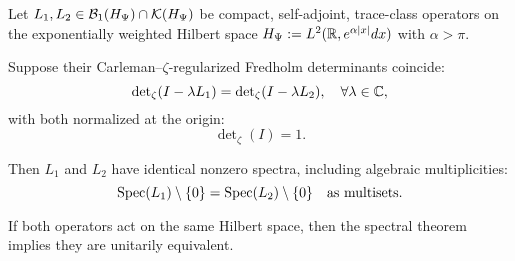 \begin{lemma}
\label{lem:spectral_rigidity_determinant}

Let \( L_1, L_2 \in \mathcal{B}_1(H_{\Psi}) \cap \mathcal{K}(H_{\Psi}) \) be compact, self-adjoint, trace-class operators on the exponentially weighted Hilbert space \( H_{\Psi} := L^2(\mathbb{R}, e^{\alpha|x|}dx) \) with \( \alpha > \pi \).

Suppose their Carleman–\(\zeta\)-regularized Fredholm determinants coincide:
\[
\det\nolimits_\zeta(I - \lambda L_1) = \det\nolimits_\zeta(I - \lambda L_2),
\quad \forall \lambda \in \mathbb{C},
\]
with both normalized at the origin:
\[
\det\nolimits_\zeta(I) = 1.
\]

Then \( L_1 \) and \( L_2 \) have identical nonzero spectra, including algebraic multiplicities:
\[
\operatorname{Spec}(L_1) \setminus \{0\} = \operatorname{Spec}(L_2) \setminus \{0\}
\quad \text{as multisets}.
\]

If both operators act on the same Hilbert space, then the spectral theorem implies they are unitarily equivalent.
\end{lemma}
